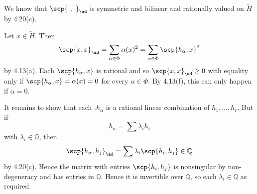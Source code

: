 We know that $\scp{\ ,\ }_{\ad}$ is symmetric and bilinear and rationally
valued on $\tilde{H}$ by 4.20(c).

Let $x \in \tilde{H}$. Then
\[ \scp{x, x}_{\ad} = \sum_{\alpha \in \Phi} \alpha(x)^2 = \sum_{\alpha \in \Phi}\scp{h_{\alpha}, x}^2 \]
by 4.13(a). Each $\scp{h_\alpha, x}$ is rational and so
$\scp{x, x}_{\ad} \geq 0$ with equality only if
$\scp{h_\alpha, x} = \alpha(x) = 0$ for every $\alpha \in \Phi$. By 4.13(f), this
can only happen if $\alpha = 0$.

It remains to show that each .$h_\alpha$ is a rational linear combination
of $h_1, \ldots, h_r$. But if
\[ h_\alpha = \sum \lambda_i h_i \] with $\lambda_i \in \mathbb{Q}$, then
\[ \scp{h_\alpha, h_j}_{\ad} = \sum \lambda_i\scp{h_i, h_j} \in \mathbb{Q} \]
by 4.20(c). Hence the matrix with entries $\scp{h_i, h_j}$ is nonsingular
by non-degeneracy and has entries in $\mathbb{Q}$. Hence it is invertible over
$\mathbb{Q}$, so each $\lambda_i \in \mathbb{Q}$ as required.
